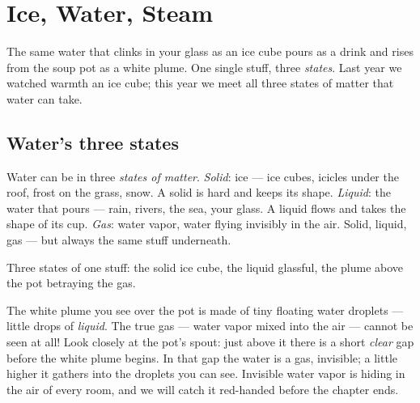 \chapter{Ice, Water, Steam}\label{ch:g2:ice-water-steam}

The same water that clinks in your glass as an ice cube pours as a
drink and rises from the soup pot as a white plume. One single stuff,
three \emph{states}. Last year we watched warmth  an ice cube;
this year we meet all three states of matter that water can take.

\section{Water's three states}

\begin{example}\label{ex:g2:ice-water-steam:where}
Water can be in three \emph{states of matter}. \emph{Solid}: ice ---
ice cubes, icicles under the roof, frost on the grass, snow. A solid
is hard and keeps its shape. \emph{Liquid}: the water that pours ---
rain, rivers, the sea, your glass. A liquid flows and takes the shape
of its cup. \emph{Gas}: water vapor, water flying invisibly in the
air. Solid, liquid, gas --- but always the same stuff underneath.
\end{example}

\begin{omfigure}

{\small Three states of one stuff: the solid ice cube, the liquid
glassful, the plume above the pot betraying the gas.}
\end{omfigure}

\begin{remark}\label{rem:g2:ice-water-steam:invisible}
The white plume you see over the pot is made of tiny floating water
droplets --- little drops of \emph{liquid}. The true gas --- water
vapor mixed into the air --- cannot be seen at all! Look closely at
the pot's spout: just above it there is a short \emph{clear} gap
before the white plume begins. In that gap the water is a gas,
invisible; a little higher it gathers into the droplets you can see.
Invisible water vapor is hiding in the air of every room, and we
will catch it red-handed before the chapter ends.
\end{remark}

